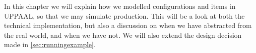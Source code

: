 In this chapter we will explain how we modelled configurations and items in UPPAAL, so that we may simulate production. This will be a look at both the technical implementation, but also a discussion on when we have abstracted from the real world, and when we have not. We will also extend the design decision made in \cref{sec:runningexample}. 




